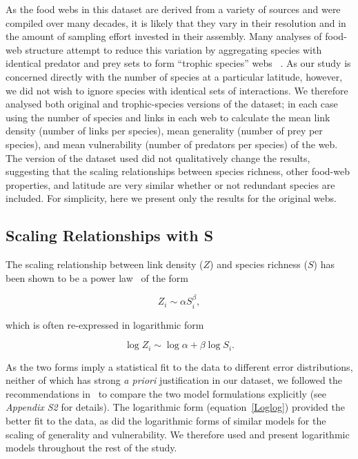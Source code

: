 \documentclass[12pt]{article}
\begin{document}
    As the food webs in this dataset are derived from a variety of sources and were compiled over many decades, it
    is likely that they vary in their resolution and in the amount of sampling effort invested in their assembly.
    Many analyses of food-web structure attempt to reduce this variation by aggregating species with identical predator and prey
    sets to form ``trophic species'' webs ~\citep{Martinez1991,Vermaat2009,Dunne2004,Dunne2013}. As our study
    is concerned directly with the number of species at a particular latitude, however, we did not wish to ignore 
    species with identical sets of interactions. We therefore analysed both original and trophic-species versions
    of the dataset; in each case using the number of species and 
    links in each web to calculate the mean link density (number of links per species), mean generality 
    (number of prey per species), and mean vulnerability (number of predators per species) of the web. 
    The version of the dataset used did not qualitatively change the results, suggesting that
    the scaling relationships between species richness, other food-web properties, and latitude are very 
    similar whether or not redundant species are included. For simplicity, here we present only
    the results for the original webs.


  \subsection*{Scaling Relationships with S}

    The scaling relationship between link density ($Z$) and species richness ($S$)
    has been shown to be a power law~\citep{Riede2010} of the form 

    \begin{equation}
    \label{Power}
    Z_{i} \sim \alpha S_{i}^{\beta}  ,
    \end{equation}

    \noindent which is often re-expressed in logarithmic form 

    \begin{equation}
    \label{Loglog}
    \log{Z_{i}} \sim \log{\alpha} + \beta\log{S_{i}}  .
    \end{equation}

    \noindent As the two forms imply a statistical fit to the data to different error 
    distributions, neither of which has strong
    \emph{a priori} justification in our dataset, we followed the recommendations in~\citet{Xiao2011}
    to compare the two model formulations explicitly (see \emph{Appendix S2} for details). 
    The logarithmic form (equation~\ref{Loglog}) provided the better fit to the data,
    as did the logarithmic forms of similar models for the scaling of generality and vulnerability. 
    We therefore used and present logarithmic models throughout the rest of the study.
\end{document}
